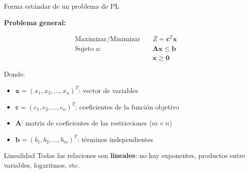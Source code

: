 \documentclass[aspectratio=169,10pt]{beamer}
\begin{document}
\begin{frame}{Forma estándar de un problema de PL}

\textbf{Problema general:}

\begin{align*}
\text{Maximizar/Minimizar} \quad & Z = \mathbf{c}^T\mathbf{x} \\
\text{Sujeto a:} \quad & \mathbf{Ax} \leq \mathbf{b} \\
& \mathbf{x} \geq \mathbf{0}
\end{align*}

Donde:
\begin{itemize}
    \item $\mathbf{x} = (x_1, x_2, \ldots, x_n)^T$: vector de variables
    \item $\mathbf{c} = (c_1, c_2, \ldots, c_n)^T$: coeficientes de la función objetivo
    \item $\mathbf{A}$: matriz de coeficientes de las restricciones ($m \times n$)
    \item $\mathbf{b} = (b_1, b_2, \ldots, b_m)^T$: términos independientes
\end{itemize}

\vspace{0.3cm}

\begin{alertblock}{Linealidad}
Todas las relaciones son \textbf{lineales}: no hay exponentes, productos entre variables, logaritmos, etc.
\end{alertblock}

\end{frame}
\end{document}
